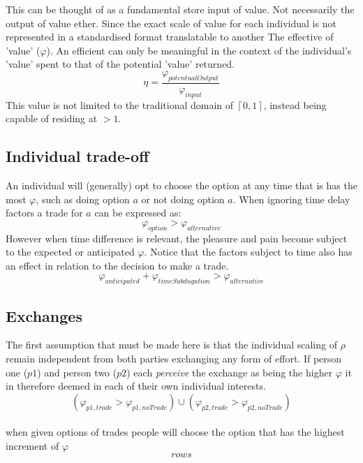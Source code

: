 \documentclass[]{article}
\begin{document}
This can be thought of as a fundamental store input of value. Not necessarily the output of value ether. Since the exact scale of value for each individual is not represented in a standardised format translatable to another The effective of 'value' ($\varphi$). An efficient can only be meaningful in the context of the individual's 'value' spent to that of the potential 'value' returned.
\begin{equation}
	\eta = \frac{\varphi_{potentualOutput}}{\varphi_{input}} 
\end{equation} 
This value is not limited to the traditional domain of $\left\lceil 0, 1 \right\rceil $, instead being capable of residing at $>1$.



\subsection{Individual trade-off}
An individual will (generally) opt to choose the option at any time that is has the most $\varphi$, such as doing option $a$ or not doing option $a$. When ignoring time delay factors a trade for $a$ can be expressed as:
\begin{equation}\label{ind_trd}
	\varphi_{option} > \varphi_{alternative}
\end{equation}
However when time difference is relevant, the pleasure and pain become subject to the expected or anticipated $\varphi$. Notice that the factors subject to time also has an effect in relation to the decision to make a trade.
\begin{equation}\label{ind_trd_tm}
	\varphi_{anticipated} + \varphi_{timeSubdugation} > \varphi_{alternative}
\end{equation}


\subsection{Exchanges}
The first assumption that must be made here is that the individual scaling of $\rho$ remain independent from both parties exchanging any form of effort. If person one ($p1$) and person two ($p2$) each \textit{perceive} the exchange as being the higher $\varphi$ it in therefore deemed in each of their own individual interests.
\begin{equation}\label{trade_def}
	(\varphi_{p1, trade} > \varphi_{p1, noTrade}) \cup (\varphi_{p2, trade} > \varphi_{p2, noTrade})
\end{equation}\\
when given options of trades people will choose the option that has the highest increment of $\varphi$
\begin{equation}\label{trade_chc}
	rows
\end{equation}
\end{document}
